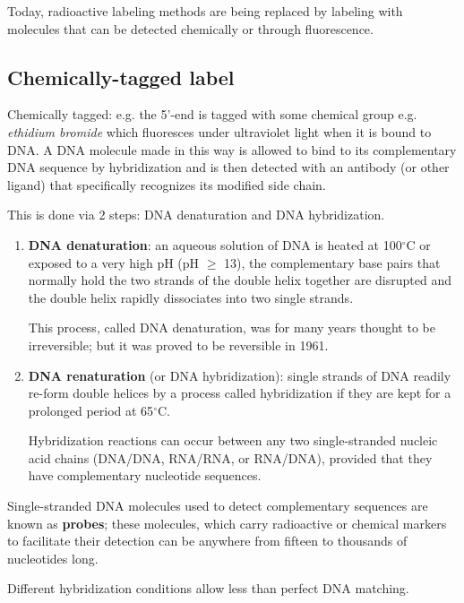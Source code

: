 Today, radioactive labeling methods are being replaced by labeling with
molecules that can be detected chemically or through fluorescence.

\subsection{Chemically-tagged label}
\label{sec:DNA-probe}

Chemically tagged: e.g. the 5'-end is tagged with some chemical group e.g. {\it
ethidium bromide} which fluoresces under ultraviolet light when it is bound to
DNA. A DNA molecule made in this way is allowed to bind to its complementary DNA
sequence by hybridization and is then detected with an antibody (or other
ligand) that specifically recognizes its modified side chain.

This is done via 2 steps: DNA denaturation and DNA hybridization.
\begin{enumerate}
  
  \label{sec:DNA-denaturation}
  \item {\bf DNA denaturation}:  an aqueous solution of DNA is heated at 100$^\circ$C
  or exposed to a very high pH (pH $\ge$ 13), the complementary base pairs that
  normally hold the two strands of the double helix together are disrupted and the double helix
  rapidly dissociates into two single strands.
  
  This process, called DNA denaturation, was for many years thought to be
  irreversible; but it was proved to be reversible in 1961.

  \label{sec:hybridization}  
  \label{sec:DNA-hybridization}  
  \item {\bf DNA renaturation} (or DNA hybridization):
   single strands of DNA readily re-form double helices by a process called
  hybridization  if they are kept for a prolonged period at 65$^\circ$C. 
  
  Hybridization reactions can occur between any two single-stranded nucleic
  acid chains (DNA/DNA, RNA/RNA, or RNA/DNA), provided that they have
  complementary nucleotide sequences.
  
\end{enumerate}
    
Single-stranded DNA molecules used to detect complementary sequences are known
as {\bf probes}; these molecules, which carry radioactive or chemical markers to
facilitate their detection can be anywhere from fifteen to thousands of
nucleotides long.

Different hybridization conditions allow less than perfect DNA matching. 


